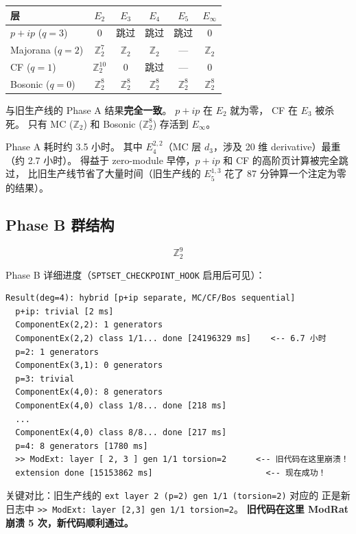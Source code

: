 \documentclass[a4paper,fontset=ubuntu,12pt]{ctexart}
\begin{document}
\begin{center}
\begin{tabular}{l|cccc|c}
\hline
层 & $E_2$ & $E_3$ & $E_4$ & $E_5$ & $E_\infty$ \\
\hline
$p{+}ip$ ($q=3$) & $0$ & 跳过 & 跳过 & 跳过 & $0$ \\
Majorana ($q=2$) & $\mathbb{Z}_2^7$ & $\mathbb{Z}_2$ & $\mathbb{Z}_2$ & --- & $\mathbb{Z}_2$ \\
CF ($q=1$) & $\mathbb{Z}_2^{10}$ & $0$ & 跳过 & --- & $0$ \\
Bosonic ($q=0$) & $\mathbb{Z}_2^8$ & $\mathbb{Z}_2^8$ & $\mathbb{Z}_2^8$ & $\mathbb{Z}_2^8$ & $\mathbb{Z}_2^8$ \\
\hline
\end{tabular}
\end{center}

与旧生产线的 Phase A 结果\textbf{完全一致}。
$p{+}ip$ 在 $E_2$ 就为零，
CF 在 $E_3$ 被杀死。
只有 MC ($\mathbb{Z}_2$) 和 Bosonic ($\mathbb{Z}_2^8$) 存活到 $E_\infty$。

Phase A 耗时约 3.5 小时。
其中 $E^{2,2}_4$（MC 层 $d_3$，涉及 20 维 derivative）最重（约 2.7 小时）。
得益于 zero-module 早停，$p{+}ip$ 和 CF 的高阶页计算被完全跳过，
比旧生产线节省了大量时间（旧生产线的 $E^{1,3}_5$ 花了 87 分钟算一个注定为零的结果）。

\subsection{Phase B 群结构}

\[
\boxed{\mathbb{Z}_2^9}
\]

Phase B 详细进度（\texttt{SPTSET\_CHECKPOINT\_HOOK} 启用后可见）：
\begin{verbatim}
Result(deg=4): hybrid [p+ip separate, MC/CF/Bos sequential]
  p+ip: trivial [2 ms]
  ComponentEx(2,2): 1 generators
  ComponentEx(2,2) class 1/1... done [24196329 ms]    <-- 6.7 小时
  p=2: 1 generators
  ComponentEx(3,1): 0 generators
  p=3: trivial
  ComponentEx(4,0): 8 generators
  ComponentEx(4,0) class 1/8... done [218 ms]
  ...
  ComponentEx(4,0) class 8/8... done [217 ms]
  p=4: 8 generators [1780 ms]
  >> ModExt: layer [ 2, 3 ] gen 1/1 torsion=2      <-- 旧代码在这里崩溃！
  extension done [15153862 ms]                       <-- 现在成功！
\end{verbatim}

关键对比：旧生产线的 \texttt{ext layer 2 (p=2) gen 1/1 (torsion=2)} 对应的
正是新日志中 \texttt{>> ModExt: layer [2,3] gen 1/1 torsion=2}。
\textbf{旧代码在这里 ModRat 崩溃 5 次，新代码顺利通过。}
\end{document}
